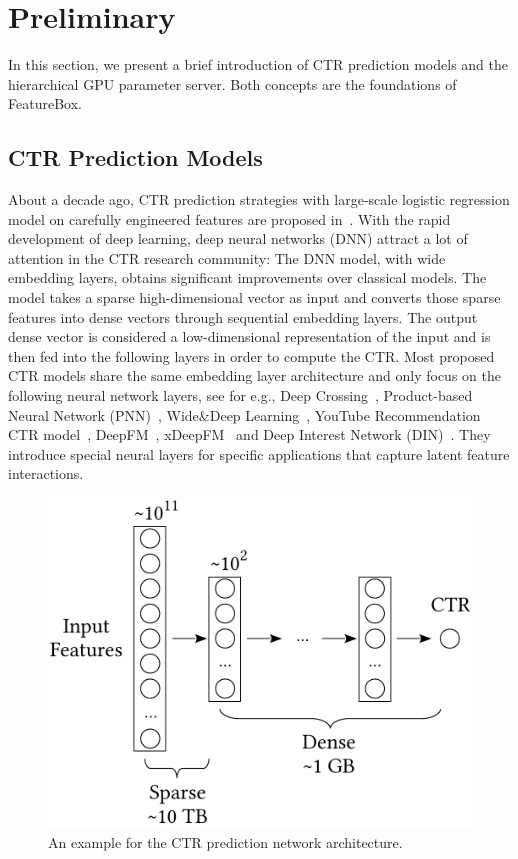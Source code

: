 \documentclass[sigconf]{acmart}
\begin{document}
\section{Preliminary}
In this section, we present a brief introduction of CTR prediction models and the hierarchical GPU parameter server. Both concepts are the foundations of FeatureBox. 

\subsection{CTR Prediction Models}
About a decade ago, CTR prediction strategies with large-scale logistic regression model on carefully engineered features are proposed in~\cite{edelman2007internet,graepel2010web}. With the rapid development of deep learning, deep neural networks (DNN) attract a lot of attention in the CTR research community: The DNN model, with wide embedding layers, obtains significant improvements over classical models. The model takes a sparse high-dimensional vector as input and converts those sparse features into dense vectors through sequential embedding layers. The output dense vector is considered a low-dimensional representation of the input and is then fed into the following layers in order to compute the CTR. Most proposed CTR models share the same embedding layer architecture and only focus on the following neural network layers, see for e.g., Deep Crossing~\cite{shan2016deep}, Product-based Neural Network (PNN)~\cite{qu2016product}, Wide\&Deep Learning~\cite{cheng2016wide}, YouTube Recommendation CTR model~\cite{covington2016deep}, DeepFM~\cite{guo2017deepfm}, xDeepFM~\cite{lian2018xdeepfm} and Deep Interest Network (DIN)~\cite{zhou2018deep}. They introduce special neural layers for specific applications that capture latent feature interactions. 
\begin{figure}[htbp]
\centering
\includegraphics[width=.35\textwidth]{figs/ctr2}
\caption{An example for the CTR prediction network architecture.}
\label{fig:ctr}%
\end{figure}
\end{document}
